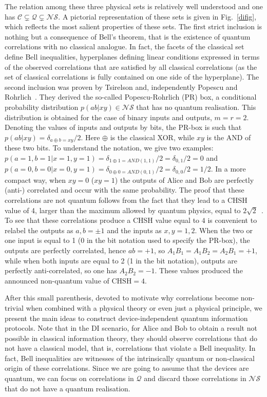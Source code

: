 \documentclass[a4paper]{article}
\begin{document}
The relation among these three physical sets is relatively well understood and one has $\mathcal C \subsetneq \mathcal Q \subsetneq \mathcal{NS}$. A pictorial representation of these sets is given in Fig.~\ref{difig}, which reflects the most salient properties of these sets. The first strict inclusion is nothing but a consequence of Bell's theorem, that is the existence of quantum correlations with no classical analogue. In fact, the facets of the classical set define Bell inequalities, hyperplanes defining linear conditions expressed in terms of the observed correlations that are satisfied by all classical correlations (as the set of classical correlations is fully contained on one side of the hyperplane). The second inclusion was proven by Tsirelson and, independently Popescu and Rohrlich~\cite{PRbox}. They derived the so-called Popescu-Rohrlich (PR) box, a conditional probability distribution $p(ab|xy)\in\mathcal{NS}$ that has no quantum realisation. This distribution is obtained for the case of binary inputs and outputs, $m=r=2$. Denoting the values of inputs and outputs by bits, the PR-box is such that $p(ab|xy)=\delta_{a\oplus b=xy}/2$. Here $\oplus$ is the classical XOR, while $xy$ is the AND of these two bits. To understand the notation, we give two examples: $p(a=1,b=1|x=1,y=1)=\delta_{1\oplus 1=AND(1,1)}/2=\delta_{0,1}/2=0$ and $p(a=0,b=0|x=0,y=1)=\delta_{0\oplus 0=AND(0,1)}/2=\delta_{0,0}/2=1/2$. In a more compact way, when $xy=0$ ($xy=1$) the outputs of Alice and Bob are perfectly (anti-) correlated and occur with the same probability. The proof that these correlations are not quantum follows from the fact that they lead to a CHSH value of 4, larger than the maximum allowed by quantum physics, equal to $2\sqrt 2$~\cite{tsirelson}. To see that these correlations produce a CHSH value equal to $4$ is convenient to relabel the outputs as $a,b=\pm 1$ and the inputs as $x,y=1,2$. When the two or one input is equal to 1 (0 in the bit notation used to specify the PR-box), the outputs are perfectly correlated, hence $ab=+1$, so $A_1B_1=A_1B_2=A_2B_1=+1$, while when both inputs are equal to 2 (1 in the bit notation), outputs are perfectly anti-correlated, so one has $A_2B_2=-1$. These values produced the announced non-quantum value of $\text{CHSH}=4$.

After this small parenthesis, devoted to motivate why correlations become non-trivial when combined with a physical theory or even just a physical principle, we present the main ideas to construct device-independent quantum information protocols. Note that in the DI scenario, for Alice and Bob to obtain a result not possible in classical information theory, they should observe correlations that do not have a classical model, that is, correlations that violate a Bell inequality. In fact, Bell inequalities are witnesses of the intrinsically quantum or non-classical origin of these correlations. Since we are going to assume that the devices are quantum, we can focus on correlations in $\mathcal Q$ and discard those correlations in $\mathcal{NS}$ that do not have a quantum realisation.
\end{document}
